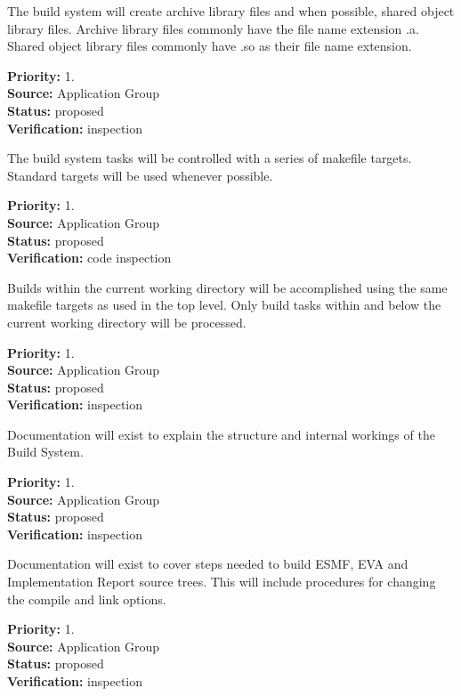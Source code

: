 

The build system will create  archive library files and when
possible, shared object library files. Archive library files commonly
have the file name extension .a.  Shared object library files commonly
have .so as their file name extension.
\begin{reqlist}
{\bf Priority:} 1. \\
{\bf Source:} Application Group \\
{\bf Status:}  proposed \\
{\bf Verification:} inspection
\end{reqlist}

The build system tasks will be controlled with a series of
makefile targets. Standard targets will be used whenever 
possible. 

\begin{reqlist}
{\bf Priority:} 1. \\
{\bf Source:} Application Group \\
{\bf Status:} proposed \\
{\bf Verification:} code inspection
\end{reqlist}

Builds within the current working directory will be
accomplished using the same makefile targets as
used in the top level.
Only build tasks within and below the current working directory
will be processed.  
\begin{reqlist}
{\bf Priority:} 1. \\
{\bf Source:} Application Group \\
{\bf Status:} proposed \\
{\bf Verification:} inspection
\end{reqlist}

Documentation will exist to explain the structure and 
internal workings of the Build System.
\begin{reqlist}
{\bf Priority:} 1. \\
{\bf Source:} Application Group \\
{\bf Status:} proposed \\
{\bf Verification:} inspection
\end{reqlist}

Documentation will exist to cover steps needed to build ESMF,
EVA and Implementation Report  source trees.  This will include procedures for 
changing the compile and link options.
\begin{reqlist}
{\bf Priority:} 1. \\
{\bf Source:} Application Group \\
{\bf Status:} proposed \\
{\bf Verification:} inspection
\end{reqlist}


